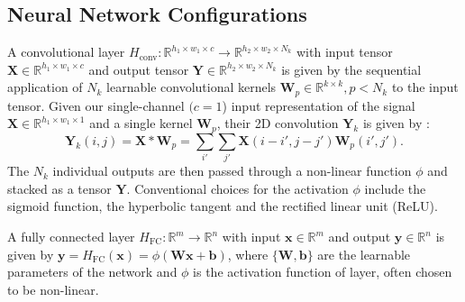 \documentclass[10pt, twocolumn]{llncs}
\begin{document}
%
\subsection{Neural Network Configurations}
%


A convolutional layer $H_{\text{conv}}:\mathbb{R}^{h_1\times w_1 \times c} \rightarrow \mathbb{R}^{h_2\times w_2 \times N_k}$ with input tensor $\mathbf{X} \in\mathbb{R}^{h_1\times w_1 \times c}$ and output tensor $\mathbf{Y} \in \mathbb{R}^{h_2\times w_2 \times N_k}$ is given by the sequential application of $N_k$ learnable convolutional kernels $\mathbf{W}_{p} \in \mathbb{R}^{k\times k}, p < N_k$ to the input tensor. Given our single-channel $(c=1$) input representation of the signal $\mathbf{X} \in\mathbb{R}^{h_1\times w_1 \times 1}$ and a single kernel $\mathbf{W}_{p}$, their 2D convolution $\mathbf{Y}_k$ is given by \cite[Ch. 9]{Goodfellow-et-al-2016}:
\begin{equation} 
    \mathbf{Y}_k(i, j) = \mathbf{X}\ast\mathbf{W}_p = \sum_{i'}\sum_{j'}\mathbf{X}(i-i',j-j')\mathbf{W}_p(i',j').
\end{equation}
The $N_k$ individual outputs are then passed through a non-linear function $\phi$ and stacked as a tensor $\mathbf{Y}$. Conventional choices for the activation $\phi$ include the sigmoid function, the hyperbolic tangent and the rectified linear unit (ReLU).

A fully connected layer $H_{\text{FC}}:\mathbb{R}^m \rightarrow \mathbb{R}^n$ with input $\mathbf{x}\in\mathbb{R}^m$ and output $\mathbf{y}\in\mathbb{R}^n$ is given by $\mathbf{y} = H_{\text{FC}}(\mathbf{x}) = \phi(\mathbf{Wx} + \mathbf{b})$, where $\{\mathbf{W}, \mathbf{b}\}$ are the learnable parameters of the network and $\phi$ is the activation function of layer, often chosen to be non-linear.
\end{document}
